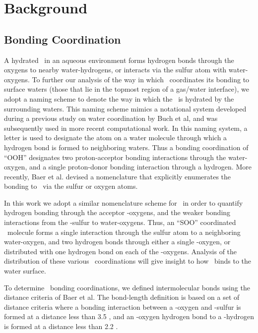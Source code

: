 \section {Background}

\subsection {Bonding Coordination}

A hydrated \suldiox~in an aqueous environment forms hydrogen bonds through the oxygens to nearby water-hydrogens, or interacts via the sulfur atom with water-oxygens.\cite{Baer2010,Bishenden1998,Steudel2009} To further our analysis of the way in which \suldiox~coordinates its bonding to surface waters (those that lie in the topmost region of a gas/water interface), we adopt a naming scheme to denote the way in which the \suldiox~is hydrated by the surrounding waters. This naming scheme mimics a notational system developed during a previous study on water coordination by Buch et al,\cite{Buch 2005} and was subsequently used in more recent computational work.\cite{Walker2006b} In this naming system, a letter is used to designate the atom on a water molecule through which a hydrogen bond is formed to neighboring waters. Thus a bonding coordination of ``OOH'' designates two proton-acceptor bonding interactions through the water-oxygen, and a single proton-donor bonding interaction through a hydrogen. More recently, Baer et al. devised a nomenclature that explicitly enumerates the bonding to \suldiox~via the sulfur or oxygen atoms.\cite{Baer2010} 

In this work we adopt a similar nomenclature scheme for \suldiox~in order to quantify hydrogen bonding through the acceptor \suldiox-oxygens, and the weaker bonding interactions from the \suldiox-sulfur to water-oxygens. Thus, an ``SOO'' coordinated \suldiox~molecule forms a single interaction through the sulfur atom to a neighboring water-oxygen, and two hydrogen bonds through either a single \suldiox-oxygen, or distributed with one hydrogen bond on each of the \suldiox-oxygens. Analysis of the distribution of these various \suldiox~coordinations will give insight to how \suldiox~binds to the water surface.

To determine \suldiox~bonding coordinations, we defined intermolecular bonds using the distance criteria of Baer et al.\cite{Baer2010} The bond-length definition is based on a set of distance criteria where a bonding interaction between a \wat-oxygen and \suldiox-sulfur is formed at a distance less than 3.5 \angs, and an \suldiox-oxygen hydrogen bond to a \wat-hydrogen is formed at a distance less than 2.2 \angs.

